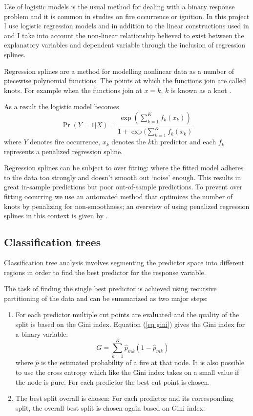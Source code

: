 \documentclass[11pt,a4paper]{article}
\begin{document}
Use of logistic models is the usual method for dealing with a binary response problem and it is common in studies on fire occurrence or ignition.  In this project I use logistic regression models and in addition to the linear constructions used in \citet{andrews03} and \citet{del11} I take into account the non-linear relationship believed to exist between the explanatory variables and dependent variable through the inclusion of regression splines.

Regression splines are a method for modelling nonlinear data as a number of piecewise  polynomial functions. The points at which the functions join are called knots. For example when the functions join at $x=k$, $k$ is known as a knot \citep{ruppert03}.

As a result the logistic model becomes
\begin{equation}
  \label{eq logits}
  \Pr(Y=1|X)=\frac{\exp(\sum_{k=1}^K f_k(x_k))}{1+\exp(\sum_{k=1}^K f_k(x_k)}
\end{equation}
where $Y$ denotes fire occurrence, $x_k$ denotes the $k$th predictor and each $f_k$ represents a penalized regression spline.

Regression splines can be subject to over fitting: where the fitted model adheres to the data too strongly and doesn't smooth out `noise' enough. This results in great in-sample predictions but poor out-of-sample predictions. To prevent over fitting occurring we use an automated method that optimizes the number of knots by penalizing for non-smoothness; an overview of using penalized regression splines in this context is given by \citet{wood02}.

\subsection{Classification trees}

Classification tree analysis involves segmenting the predictor space into different regions in order to find the best predictor for the response variable.

The task of finding the single best predictor is achieved using recursive partitioning of the data and can be summarized as two major steps:
\begin{enumerate}
  \item For each predictor multiple cut points are evaluated and the quality of the split is based on the Gini index. Equation (\ref{eq gini}) gives the Gini index for a binary variable:
  \begin{equation}
          \label{eq gini}
          G=\sum_{k=1}^{K} \hat{p}_{mk} (1-\hat{p}_{mk})
  \end{equation}
  where $\hat{p}$ is the estimated probability of a fire at that node. It is also possible to use the cross entropy \citep{james13} which like the Gini index takes on a small value if the node is pure. For each predictor the best cut point is chosen.
  \item The best split overall is chosen:  For each predictor and its corresponding split, the overall best split is chosen again based on Gini index.
\end{enumerate}
\end{document}
